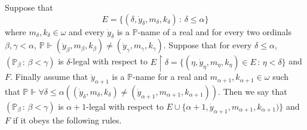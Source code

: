\documentclass[a4paper,11pt]{article}
\newcommand{\forceP}{\mathbb{P}}
\begin{document}
Suppose that 
\[E= \{(\delta, \dot{y}_{\delta}, m_{\delta} ,k_{\delta}) \, : \,  \delta \le \alpha\}\]
where $m_{\delta},k_{\delta} \in \omega$ and every $\dot{y}_{\delta}$ is a  $\forceP$-name of a real and for every two ordinals $\beta, \gamma< \alpha$, $\forceP \Vdash (\dot{y}_{\beta}, m_{\beta},k_{\beta}) \ne (\dot{y}_{\gamma},m_{\gamma},k_{\gamma})$. Suppose that for every $\delta \le \alpha$, $(\forceP_{\beta} \, : \, \beta < \gamma )$ is $\delta$-legal with respect to $E \upharpoonright \delta = \{ (\eta, \dot{y}_{\eta},m_{\eta},k_{\eta}) \in E \, : \, \eta < \delta \}$ and $F$.
Finally assume that $\dot{y}_{\alpha+1}$ is a $\forceP$-name for a real and $m_{\alpha+1},k_{\alpha+1} \in \omega$ such that $\forceP \Vdash \forall \delta \le \alpha ((\dot{y}_{\delta},m_{\delta},k_{\delta}) \ne (\dot{y}_{\alpha+1},m_{\alpha+1},k_{\alpha+1}))$. Then we say that $(\forceP_{\beta} \, : \, \beta < \gamma )$ is $\alpha+1$-legal with respect to $E \cup \{\alpha+1, \dot{y}_{\alpha+1},m_{\alpha+1},k_{\alpha+1})\}$ and $F$ if it obeys the following rules. 
\end{document}
